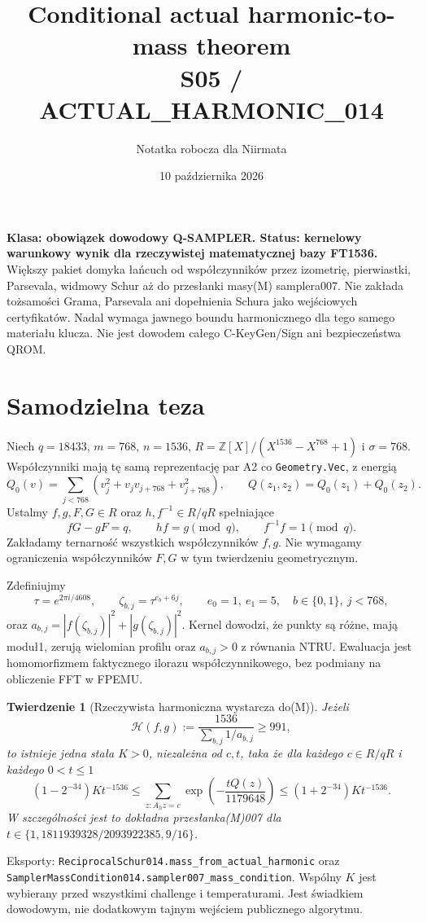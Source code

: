 \documentclass[11pt,a4paper]{article}
\title{Conditional actual harmonic-to-mass theorem\\\large S05 / ACTUAL\_HARMONIC\_014}
\author{Notatka robocza dla Niirmata}\date{10 października 2026}
\newcommand{\code}[1]{\nolinkurl{#1}}
\newtheorem{theorem}{Twierdzenie}
\begin{document}
\maketitle
\textbf{Klasa: obowiązek dowodowy Q-SAMPLER. Status: kernelowy warunkowy
wynik dla rzeczywistej matematycznej bazy FT1536.} Większy pakiet domyka
łańcuch od współczynników przez izometrię, pierwiastki, Parsevala, widmowy
Schur aż do przesłanki masy(M) samplera007. Nie zakłada tożsamości Grama,
Parsevala ani dopełnienia Schura jako wejściowych certyfikatów.
Nadal wymaga jawnego boundu harmonicznego dla tego samego materiału klucza.
Nie jest dowodem całego C-KeyGen/Sign ani bezpieczeństwa QROM.

\section{Samodzielna teza}
Niech $q=18433$, $m=768$, $n=1536$,
$R=\mathbb Z[X]/(X^{1536}-X^{768}+1)$ i $\sigma=768$.
Współczynniki mają tę samą reprezentację par A2 co \code{Geometry.Vec},
z energią
\[
 Q_0(v)=\sum_{j<768}(v_j^2+v_jv_{j+768}+v_{j+768}^2),\qquad
 Q(z_1,z_2)=Q_0(z_1)+Q_0(z_2).
\]
Ustalmy $f,g,F,G\in R$ oraz $h,f^{-1}\in R/qR$ spełniające
\[
 fG-gF=q,\qquad hf=g\pmod q,\qquad f^{-1}f=1\pmod q.
\]
Zakładamy ternarność wszystkich współczynników $f,g$.
Nie wymagamy ograniczenia współczynników $F,G$ w tym twierdzeniu geometrycznym.

Zdefiniujmy
\[
 \tau=e^{2\pi i/4608},\qquad
 \zeta_{b,j}=\tau^{e_b+6j},\qquad
 e_0=1,\ e_1=5,\quad b\in\{0,1\},\ j<768,
\]
oraz $a_{b,j}=|f(\zeta_{b,j})|^2+|g(\zeta_{b,j})|^2$.
Kernel dowodzi, że punkty są różne, mają moduł1, zerują wielomian profilu
oraz $a_{b,j}>0$ z równania NTRU. Ewaluacja jest homomorfizmem faktycznego
ilorazu współczynnikowego, bez podmiany na obliczenie FFT w FPEMU.

\begin{theorem}[Rzeczywista harmoniczna wystarcza do(M)]
Jeżeli
\[
 \mathcal H(f,g):=\frac{1536}{\sum_{b,j}1/a_{b,j}}\ge991,
\]
to istnieje jedna stała $K>0$, niezależna od $c,t$, taka że dla każdego
$c\in R/qR$ i każdego $0<t\le1$
\[
 (1-2^{-34})K t^{-1536}\le
 \sum_{z:A_hz=c}\exp\!\left(-\frac{tQ(z)}{1179648}\right)
 \le(1+2^{-34})K t^{-1536}.
\]
W szczególności jest to dokładna przesłanka(M)007 dla
$t\in\{1,1811939328/2093922385,9/16\}$.
\end{theorem}
Eksporty: \code{ReciprocalSchur014.mass_from_actual_harmonic} oraz
\code{SamplerMassCondition014.sampler007_mass_condition}.
Wspólny $K$ jest wybierany przed wszystkimi challenge i temperaturami.
Jest świadkiem dowodowym, nie dodatkowym tajnym wejściem publicznego algorytmu.
\end{document}
